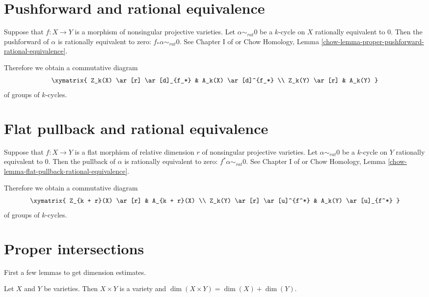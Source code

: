 \section{Pushforward and rational equivalence}
\label{section-pushforward-and-rational-equivalence}

\noindent
Suppose that $f : X \to Y$ is a morphism of nonsingular projective varieties.
Let $\alpha \sim_{rat} 0$ be a $k$-cycle on
$X$ rationally equivalent to $0$. Then the {pushforward}
of $\alpha$ is rationally equivalent to zero:
$f_* \alpha \sim_{rat} 0$. See Chapter I of \cite{F} or
Chow Homology, Lemma \ref{chow-lemma-proper-pushforward-rational-equivalence}.

\medskip\noindent
Therefore we obtain a commutative diagram
$$
\xymatrix{
Z_k(X) \ar[r] \ar[d]_{f_*} & A_k(X) \ar[d]^{f_*} \\
Z_k(Y) \ar[r] & A_k(Y)
}
$$
of groups of $k$-cycles.


\section{Flat pullback and rational equivalence}
\label{section-flat-pullback-and-rational-equivalence}

\noindent
Suppose that $f : X \to Y$ is a flat morphism of relative dimension $r$
of nonsingular projective varieties.
Let $\alpha \sim_{rat} 0$ be a $k$-cycle on
$Y$ rationally equivalent to $0$. Then the pullback
of $\alpha$ is rationally equivalent to zero:
$f^* \alpha \sim_{rat} 0$. See Chapter I of \cite{F} or
Chow Homology, Lemma \ref{chow-lemma-flat-pullback-rational-equivalence}.

\medskip\noindent
Therefore we obtain a commutative diagram
$$
\xymatrix{
Z_{k + r}(X) \ar[r] & A_{k + r}(X) \\
Z_k(Y) \ar[r] \ar[u]^{f^*} & A_k(Y) \ar[u]_{f^*}
}
$$
of groups of $k$-cycles.


\section{Proper intersections}
\label{section-intersect-properly}

\noindent
First a few lemmas to get dimension estimates.

\begin{lemma}
\label{lemma-dimension-product-varieties}
Let $X$ and $Y$ be varieties. Then $X \times Y$ is a variety and
$\dim(X \times Y) = \dim(X) + \dim(Y)$.
\end{lemma}

